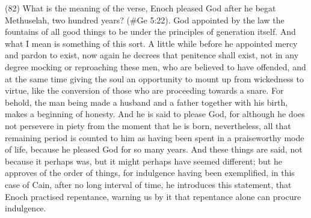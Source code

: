 (82) What is the meaning of the verse, Enoch pleased God after he begat Methuselah, two
hundred years? (\#Ge 5:22). God appointed by the law the fountains of all good things to be
under the principles of generation itself. And what I mean is something of this sort. A little while
before he appointed mercy and pardon to exist, now again he decrees that penitence shall exist,
not in any degree mocking or reproaching these men, who are believed to have offended, and at
the same time giving the soul an opportunity to mount up from wickedness to virtue, like the
conversion of those who are proceeding towards a snare. For behold, the man being made a
husband and a father together with his birth, makes a beginning of honesty. And he is said to
please God, for although he does not persevere in piety from the moment that he is born,
nevertheless, all that remaining period is counted to him as having been spent in a praiseworthy
mode of life, because he pleased God for so many years. And these things are said, not because
it perhaps was, but it might perhaps have seemed different; but he approves of the order of things,
for indulgence having been exemplified, in this case of Cain, after no long interval of time, he
introduces this statement, that Enoch practised repentance, warning us by it that repentance alone
can procure indulgence.

